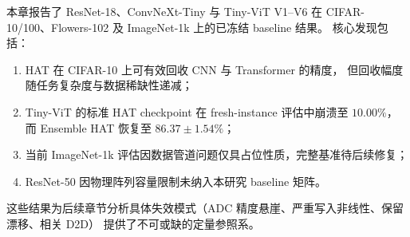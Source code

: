 本章报告了 ResNet-18、ConvNeXt-Tiny 与 Tiny-ViT V1--V6 在 CIFAR-10/100、Flowers-102 及 ImageNet-1k 上的已冻结 baseline 结果。
核心发现包括：
\begin{enumerate}
    \item HAT 在 CIFAR-10 上可有效回收 CNN 与 Transformer 的精度，
    但回收幅度随任务复杂度与数据稀缺性递减；
    \item Tiny-ViT 的标准 HAT checkpoint 在 fresh-instance 评估中崩溃至 $10.00\%$，
    而 Ensemble HAT 恢复至 $86.37\pm1.54\%$；
    \item 当前 ImageNet-1k 评估因数据管道问题仅具占位性质，完整基准待后续修复；
    \item ResNet-50 因物理阵列容量限制未纳入本研究 baseline 矩阵。
\end{enumerate}

这些结果为后续章节分析具体失效模式（ADC 精度悬崖、严重写入非线性、保留漂移、相关 D2D）
提供了不可或缺的定量参照系。
